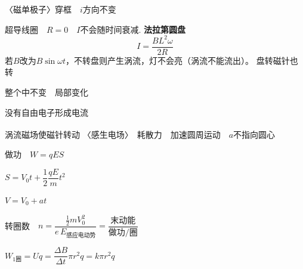 \noindent 〈磁单极子〉穿框　$i$方向不变

\noindent 超导线圈　$R=0$　$I$不会随时间衰减.
\noindent \textbf{法拉第圆盘}
\[ I=\dfrac{BL^2\omega}{2R} \]
\noindent 若$B$改为$B\sin\omega t$，不转盘则产生涡流，灯不会亮（涡流不能流出）。
\noindent 盘转磁针也转

\noindent 整个中不变　局部变化

\noindent 没有自由电子形成电流

\noindent 涡流\textsuperscript{}磁场使磁针转动
\noindent 〈感生电场〉　耗散力　加速圆周运动　$a$不指向圆心

\noindent 做功　$W=qES$

\noindent \hspace*{2em}$S=V_0t+\dfrac{1}{2}\dfrac{qE}{m}t^2$

\noindent \hspace*{2em}$V=V_0+at$

\noindent 转圈数　$n=\dfrac{\frac{1}{2}mV_0^2}{e\,E_{\text{感应电动势}}}=\dfrac{\text{末动能}}{\text{做功/圈}}$%

\noindent $W_{1\text{圈}}=Uq=\dfrac{\Delta B}{\Delta t}\pi r^2q=k\pi r^2q$

